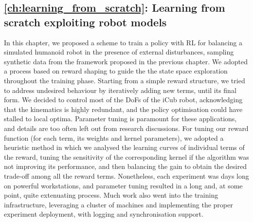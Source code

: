 \subsection*{\autoref{ch:learning_from_scratch}: Learning from scratch exploiting robot models}

In this chapter, we proposed a scheme to train a policy with \ac{RL} for balancing a simulated humanoid robot in the presence of external disturbances, sampling synthetic data from the framework proposed in the previous chapter.
We adopted a process based on reward shaping to guide the the state space exploration throughout the training phase.
Starting from a simple reward structure, we tried to address undesired behaviour by iteratively adding new terms, until its final form.
We decided to control most of the \acp{DoF} of the iCub robot, acknowledging that the kinematics is highly redundant, and the policy optimisation could have stalled to local optima.
Parameter tuning is paramount for these applications, and details are too often left out from research discussions.
For tuning our reward function (for each term, its weights and kernel parameters), we adopted a heuristic method in which we analysed the learning curves of individual terms of the reward, tuning the sensitivity of the corresponding kernel if the algorithm was not improving its performance, and then balancing the gain to obtain the desired trade-off among all the reward terms.
Nonetheless, each experiment was days long on powerful workstations, and parameter tuning resulted in a long and, at some point, quite extenuating process.
Much work also went into the training infrastructure, leveraging a cluster of machines and implementing the proper experiment deployment, with logging and synchronisation support.

